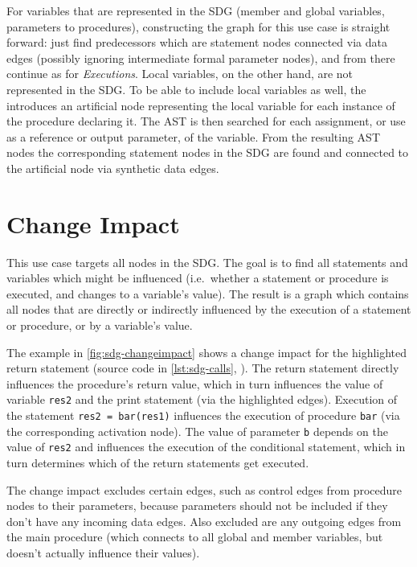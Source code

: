 For variables that are represented in the SDG (member and global variables, parameters to procedures), constructing the 
graph for this use case is straight forward: just find predecessors which are statement nodes connected via data edges 
(possibly ignoring intermediate formal parameter nodes), and from there continue as for \emph{Executions}. Local 
variables, on the other hand, are not represented in the SDG. To be able to include local variables as well, the \SB 
introduces an artificial node representing the local variable for each instance of the procedure declaring it. The AST 
is then searched for each assignment, or use as a reference or output parameter, of the variable. From the resulting 
AST nodes the corresponding statement nodes in the SDG are found and connected to the artificial node via synthetic 
data edges.


\section{Change Impact}

This use case targets all nodes in the SDG. The goal is to find all statements and variables which might be influenced 
(i.e.\ whether a statement or procedure is executed, and changes to a variable's value). The result is a graph which 
contains all nodes that are directly or indirectly influenced by the execution of a statement or procedure, or by a 
variable's value.

The example in \autoref{fig:sdg-changeimpact} shows a change impact for the highlighted return statement (source code 
in \autoref{lst:sdg-calls}, ). The return statement directly influences the procedure's 
return value, which in turn influences the value of variable \lstinline|res2| and the print statement (via the 
highlighted edges). Execution of the statement \lstinline|res2 = bar(res1)| influences the execution of procedure 
\lstinline|bar| (via the corresponding activation node). The value of parameter \lstinline|b| depends on the value of 
\lstinline|res2| and influences the execution of the conditional statement, which in turn determines which of the 
return statements get executed.

The change impact excludes certain edges, such as control edges from procedure nodes to their parameters, because 
parameters should not be included if they don't have any incoming data edges. Also excluded are any outgoing edges from 
the main procedure (which connects to all global and member variables, but doesn't actually influence their values).

